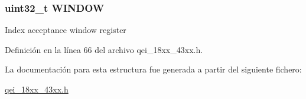 \subsubsection[{\texorpdfstring{W\+I\+N\+D\+OW}{WINDOW}}]{ uint32\+\_\+t W\+I\+N\+D\+OW}\hypertarget{struct_l_p_c___q_e_i___t_a0ce43cecac8e564afd27fe0489eaff41}{}\label{struct_l_p_c___q_e_i___t_a0ce43cecac8e564afd27fe0489eaff41}
Index acceptance window register 

Definición en la línea 66 del archivo qei\+\_\+18xx\+\_\+43xx.\+h.



La documentación para esta estructura fue generada a partir del siguiente fichero\+:\begin{DoxyCompactItemize}
\item 
\hyperlink{qei__18xx__43xx_8h}{qei\+\_\+18xx\+\_\+43xx.\+h}\end{DoxyCompactItemize}
